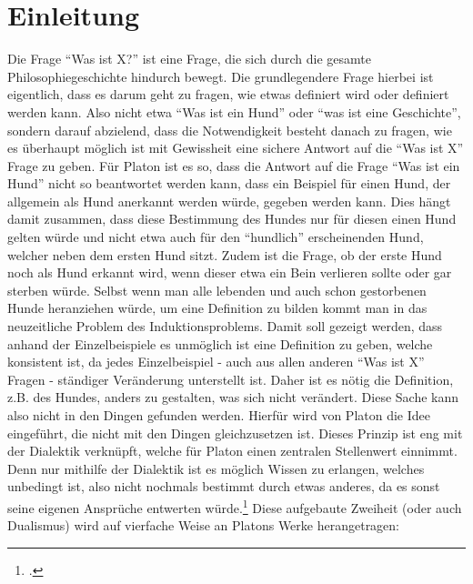 \section{Einleitung}

Die Frage \enquote{Was ist X?} ist eine Frage, die sich durch die gesamte Philosophiegeschichte hindurch bewegt. Die grundlegendere Frage hierbei ist eigentlich, dass es darum geht zu fragen, wie etwas definiert wird oder definiert werden kann. Also nicht etwa \enquote{Was ist ein Hund} oder \enquote{was ist eine Geschichte}, sondern darauf abzielend, dass die Notwendigkeit besteht danach zu fragen, wie es überhaupt möglich ist mit Gewissheit eine sichere Antwort auf die \enquote{Was ist X} Frage zu geben. Für Platon ist es so, dass die Antwort auf die Frage \enquote{Was ist ein Hund} nicht so beantwortet werden kann, dass ein Beispiel für einen Hund, der allgemein als Hund anerkannt werden würde, gegeben werden kann. Dies hängt damit zusammen, dass diese Bestimmung des Hundes nur für diesen einen Hund gelten würde und nicht etwa auch für den \enquote{hundlich} erscheinenden Hund, welcher neben dem ersten Hund sitzt. Zudem ist die Frage, ob der erste Hund noch als Hund erkannt wird, wenn dieser etwa ein Bein verlieren sollte oder gar sterben würde. Selbst wenn man alle lebenden und auch schon gestorbenen Hunde heranziehen würde, um eine Definition zu bilden kommt man in das neuzeitliche Problem des Induktionsproblems. Damit soll gezeigt werden, dass anhand der Einzelbeispiele es unmöglich ist eine Definition zu geben, welche konsistent ist, da jedes Einzelbeispiel - auch aus allen anderen \enquote{Was ist X} Fragen - ständiger Veränderung unterstellt ist. Daher ist es nötig die Definition, z.B. des Hundes, anders zu gestalten, was sich nicht verändert. Diese Sache kann also nicht in den Dingen gefunden werden. Hierfür wird von Platon die Idee eingeführt, die nicht mit den Dingen gleichzusetzen ist. 
Dieses Prinzip ist eng mit der Dialektik verknüpft, welche für Platon einen zentralen Stellenwert einnimmt. Denn nur mithilfe der Dialektik ist es möglich Wissen zu erlangen, welches unbedingt ist, also nicht nochmals bestimmt durch etwas anderes, da es sonst seine eigenen Ansprüche entwerten würde.\footcite[vgl.][S.83]{Staudacher}
Diese aufgebaute Zweiheit (oder auch Dualismus) wird auf vierfache Weise an Platons Werke herangetragen:
